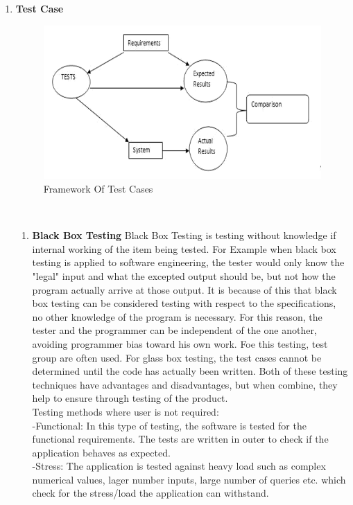 \begin{enumerate}
\begin{enumerate}
\item\textbf{Test Case}
\begin{figure}[h]
\begin{center}
\includegraphics[scale=0.75]{testing.png}
\caption{Framework Of Test Cases}
\end{center}
\end{figure}\\
\begin{enumerate}
\item\textbf{Black Box Testing}
     Black Box Testing is testing without knowledge if internal working of the item being tested. For Example when black box testing is applied to software engineering, the tester would only know the "legal" input and what the excepted output should be, but not how the program actually arrive at those output. It is because of this that black box testing can be considered testing with respect to the specifications, no other knowledge of the program is necessary. For this reason, the tester and the programmer can be independent of the one another, avoiding programmer bias toward his own work. Foe this testing, test group are often used. For glass box testing, the test cases cannot be determined until the code has actually been written. Both of these testing techniques have advantages and disadvantages, but when combine, they help to ensure through testing of the product.\\
Testing methods where user is not required:\\
-Functional: In this type of testing, the software is tested for the functional requirements. The tests are written in outer to check if the application behaves as expected.\\
-Stress: The application is tested against heavy load such as complex numerical values, lager number inputs, large number of queries etc. which check for the stress/load the application can withstand.\\

\end{enumerate}
\end{enumerate}
\end{enumerate}
